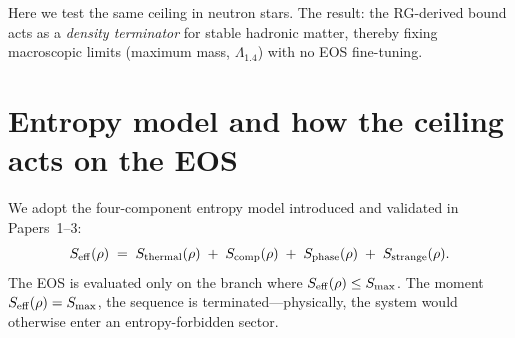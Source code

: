 \documentclass[11pt]{article}
\begin{document}
Here we test the same ceiling in neutron stars. The result: the RG-derived bound acts as a \emph{density terminator} for stable hadronic matter, thereby fixing macroscopic limits (maximum mass, $\Lambda_{1.4}$) with no EOS fine-tuning.

\section{Entropy model and how the ceiling acts on the EOS}
\label{sec:entropy-model}
We adopt the four-component entropy model introduced and validated in Papers~1--3:
\begin{equation}
S_{\rm eff}(\rho) \;=\; S_{\rm thermal}(\rho)\;+\;S_{\rm comp}(\rho)\;+\;S_{\rm phase}(\rho)\;+\;S_{\rm strange}(\rho).
\end{equation}
The EOS is evaluated only on the branch where $S_{\rm eff}(\rho)\le S_{\max}$. The moment $S_{\rm eff}(\rho)=S_{\max}$, the sequence is terminated---physically, the system would otherwise enter an entropy-forbidden sector.
\end{document}
